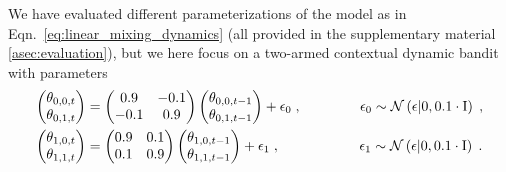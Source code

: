 \documentclass{article}
\newcommand{\N}[1]{\mathcal{N}\left( #1\right)}
\def\addappendix{}
\begin{document}
We have evaluated different parameterizations of the model as in Eqn.~\eqref{eq:linear_mixing_dynamics} (all provided in
\ifx\addappendix\undefined the supplementary material \else \autoref{asec:evaluation}\fi),
but we here focus on a two-armed contextual dynamic bandit with parameters
\begin{equation}
\begin{split}
\begin{pmatrix}
\theta_{0,0,t}\\
\theta_{0,1,t}\\
\end{pmatrix} &= \begin{pmatrix}
0.9 & -0.1 \\
-0.1 & 0.9 \\
\end{pmatrix} \begin{pmatrix}
\theta_{0,0,t-1}\\
\theta_{0,1,t-1}\\
\end{pmatrix} + \epsilon_0 \; , \hspace*{1.47cm} \epsilon_0 \sim \N{\epsilon|0,0.1 \cdot\mathrm{I}} \;,\\
\begin{pmatrix}
\theta_{1,0,t}\\
\theta_{1,1,t}\\
\end{pmatrix} &= \begin{pmatrix}
0.9 & 0.1 \\
0.1 & 0.9 \\
\end{pmatrix} \begin{pmatrix}
\theta_{1,0,t-1}\\
\theta_{1,1,t-1}\\
\end{pmatrix} + \epsilon_1 \; , \hspace*{2.0cm} \epsilon_1 \sim \N{\epsilon|0,0.1 \cdot\mathrm{I}} \;.
\end{split}
\label{eq:dynamic_bandit_dynamics}
\end{equation}
\end{document}
